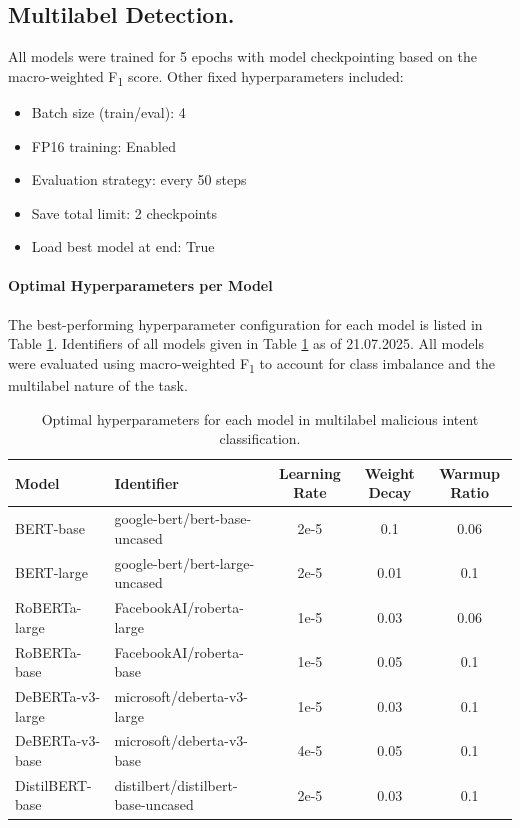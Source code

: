 \documentclass[11pt]{article}
\begin{document}
\subsection{Multilabel Detection.}


All models were trained for 5 epochs with model checkpointing based on the macro-weighted F\textsubscript{1} score. Other fixed hyperparameters included:
\begin{itemize}[nosep, leftmargin=*]
    \item Batch size (train/eval): 4
    \item FP16 training: Enabled
    \item Evaluation strategy: every 50 steps
    \item Save total limit: 2 checkpoints
    \item Load best model at end: True
\end{itemize}

\paragraph{Optimal Hyperparameters per Model}

The best-performing hyperparameter configuration for each model is listed in Table \ref{tab:hyperparams_multilabel}. Identifiers of all models given in Table \ref{tab:hyperparams_multilabel} as of 21.07.2025. All models were evaluated using macro-weighted F\textsubscript{1} to account for class imbalance and the multilabel nature of the task.

\begin{table}[ht]
\centering
\small
\begin{tabular}{llccc}
\toprule
\textbf{Model} & \textbf{Identifier} & \textbf{Learning Rate} & \textbf{Weight Decay} & \textbf{Warmup Ratio} \\
\midrule
BERT-base & google-bert/bert-base-uncased & 2e-5 & 0.1  & 0.06 \\
BERT-large & google-bert/bert-large-uncased & 2e-5 & 0.01 & 0.1 \\
RoBERTa-large & FacebookAI/roberta-large & 1e-5 & 0.03 & 0.06 \\
RoBERTa-base & FacebookAI/roberta-base & 1e-5 & 0.05 & 0.1 \\
DeBERTa-v3-large & microsoft/deberta-v3-large & 1e-5 & 0.03 & 0.1 \\
DeBERTa-v3-base & microsoft/deberta-v3-base & 4e-5 & 0.05 & 0.1 \\
DistilBERT-base & distilbert/distilbert-base-uncased & 2e-5 & 0.03 & 0.1 \\
\bottomrule
\end{tabular}
\caption{Optimal hyperparameters for each model in multilabel malicious intent classification.}
\label{tab:hyperparams_multilabel}
\end{table}
\end{document}
